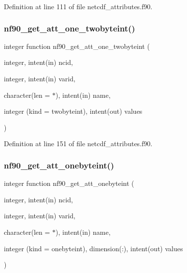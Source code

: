 Definition at line 111 of file netcdf\+\_\+attributes.\+f90.

\mbox{\label{netcdf__attributes_8f90_aa56b215c5412ae5544a3f87fd90a3db7}} 
\subsubsection{\texorpdfstring{nf90\+\_\+get\+\_\+att\+\_\+one\+\_\+twobyteint()}{nf90\_get\_att\_one\_twobyteint()}}
{\footnotesize\ttfamily integer function nf90\+\_\+get\+\_\+att\+\_\+one\+\_\+twobyteint (\begin{DoxyParamCaption}\item[{integer, intent(in)}]{ncid,  }\item[{integer, intent(in)}]{varid,  }\item[{character(len = $\ast$), intent(in)}]{name,  }\item[{integer (kind = twobyteint), intent(out)}]{values }\end{DoxyParamCaption})}



Definition at line 151 of file netcdf\+\_\+attributes.\+f90.

\mbox{\label{netcdf__attributes_8f90_adecd3d01fbb8ee879340d3e87125fa56}} 
\subsubsection{\texorpdfstring{nf90\+\_\+get\+\_\+att\+\_\+onebyteint()}{nf90\_get\_att\_onebyteint()}}
{\footnotesize\ttfamily integer function nf90\+\_\+get\+\_\+att\+\_\+onebyteint (\begin{DoxyParamCaption}\item[{integer, intent(in)}]{ncid,  }\item[{integer, intent(in)}]{varid,  }\item[{character(len = $\ast$), intent(in)}]{name,  }\item[{integer (kind = onebyteint), dimension(\+:), intent(out)}]{values }\end{DoxyParamCaption})}



